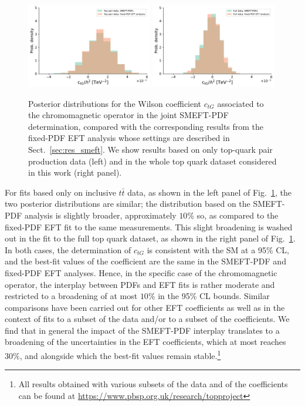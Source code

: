\documentclass[withindex,glossary]{cam-thesis}
\begin{document}
\begin{figure}[t]
\centering
\includegraphics[width=0.49\textwidth]{smeft_plots/plot_otg_ttbar_nlo_lin.pdf}
\includegraphics[width=0.49\textwidth]{smeft_plots/plot_otg_alltop_nlo_lin.pdf}
\caption{Posterior distributions for the Wilson coefficient $c_{tG}$
  associated to the chromomagnetic operator in the joint SMEFT-PDF determination, compared
  with the corresponding results from the fixed-PDF EFT analysis whose settings are described in
  Sect.~\ref{sec:res_smeft}.
  We show results based on only top-quark pair production data (left) and
  in the whole top quark dataset considered in this work (right panel).
}
\label{fig:simultaneous_broadening}
\end{figure}

For fits based only on inclusive $t\bar{t}$ data, as shown in the left panel of
Fig.~\ref{fig:simultaneous_broadening}, the two posterior
distributions are similar; the distribution based on the SMEFT-PDF analysis
is slightly broader, approximately $10 \%$ so, as compared to the fixed-PDF EFT fit
to the same measurements.
%
This slight broadening is washed out in the fit to the full top quark dataset, as shown in the right panel of Fig.~\ref{fig:simultaneous_broadening}.
%
In both cases, the determination of $c_{tG}$ is consistent with the SM
at a 95\% CL, and the best-fit values of the coefficient
are the same in the SMEFT-PDF and fixed-PDF EFT analyses.
%
Hence, in the specific case of the chromomagnetic operator, the interplay between PDFs and EFT fits
is rather moderate and restricted to a broadening of at most $10\%$ in the 95\% CL bounds.
%
Similar comparisons have been carried out for other EFT coefficients as well as in the context
of fits to a subset of the data and/or to a subset of the coefficients.
%
We find that in general the impact of the SMEFT-PDF interplay
translates to a broadening of the uncertainties
in the EFT coefficients, which at most reaches $30\%$, and
alongside which the best-fit values remain stable.\footnote{All results
  obtained with various subsets of the data and of the
  coefficients can be found at \url{https://www.pbsp.org.uk/research/topproject}}
%
\end{document}
